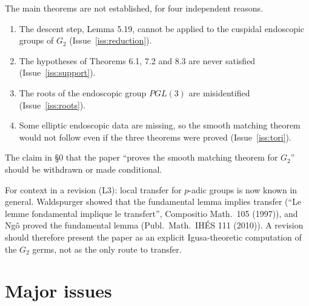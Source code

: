 \documentclass[12pt,letterpaper]{article}
\newcommand{\Lv}[1]{\textsf{L#1}}
\theoremstyle{definition}
\begin{document}
The main theorems are not established, for four independent reasons.
\begin{enumerate}
\item The descent step, Lemma 5.19, cannot be applied to the cuspidal
endoscopic groups of $G_2$ (Issue~\ref{iss:reduction}).
\item The hypotheses of Theorems 6.1, 7.2 and 8.3 are never satisfied
(Issue~\ref{iss:support}).
\item The roots of the endoscopic group $PGL(3)$ are misidentified
(Issue~\ref{iss:roots}).
\item Some elliptic endoscopic data are missing, so the smooth matching
theorem would not follow even if the three theorems were proved
(Issue~\ref{iss:tori}).
\end{enumerate}
The claim in \S0 that the paper ``proves the smooth matching theorem for
$G_2$'' should be withdrawn or made conditional.

For context in a revision (\Lv{3}): local transfer for $p$-adic groups is now
known in general. Waldspurger showed that the fundamental lemma implies
transfer (``Le lemme fondamental implique le transfert'', Compositio Math.\
105 (1997)), and Ng\^o proved the fundamental lemma (Publ.\ Math.\ IH\'ES 111
(2010)). A revision should therefore present the paper as an explicit
Igusa-theoretic computation of the $G_2$ germs, not as the only route to
transfer.

\section{Major issues}
\end{document}
